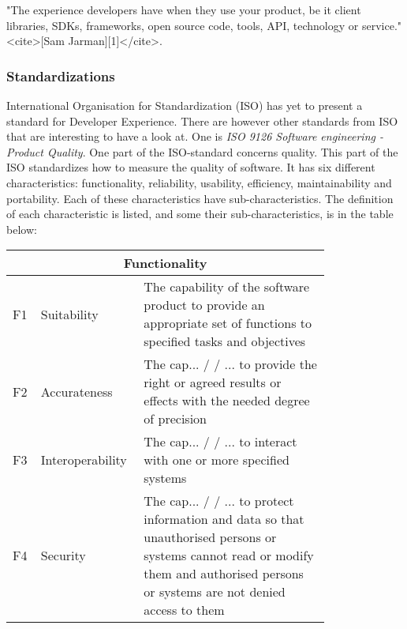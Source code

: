 \documentclass[11pt]{article}
\begin{document}
\begin{multicols}{2}
\begin{displayquote}
"The experience developers have when they use your product, be it
client libraries, SDKs, frameworks, open source code, tools, API,
technology or service." <cite>[Sam Jarman][1]</cite>.
\end{displayquote}

        \subsubsection{Standardizations}
        International Organisation for Standardization (ISO) has yet to present a
        standard for Developer Experience. There are however other standards from ISO
        that are interesting to have a look at. One is \textit{ISO 9126 Software engineering - Product Quality}.
        One part of the ISO-standard concerns quality. This part of the ISO standardizes how to measure the quality of software.
        It has six different characteristics: functionality, reliability, usability, efficiency, maintainability and
        portability. Each of these characteristics have sub-characteristics. The definition of each
        characteristic is listed, and some their sub-characteristics, is in the table below:


    \begin{table}[]
        \centering
        \begin{tabular}{|p{0.05\linewidth}|p{0.2\linewidth}|p{0.55\linewidth}|}
            \hline

            \multicolumn{3}{c}{\textbf{Functionality}} \\ \hline
            F1  &   Suitability &The capability of the software product to provide an appropriate set of
            functions to specified tasks and objectives \\ \hline
            F2  &   Accurateness &  The cap... / / ... to provide the right or agreed results or effects with the needed
            degree of precision \\ \hline
            F3  &   Interoperability& The cap... / / ... to interact with one or more specified systems \\ \hline
            F4  &   Security& The cap... / / ... to protect information and data so that unauthorised persons or systems
            cannot read or modify them and authorised persons or systems are not denied access to them \\ \hline


\end{tabular}
\end{table}
\end{multicols}
\end{document}
